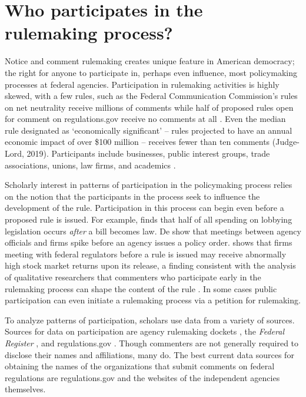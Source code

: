 \documentclass[12pt,notitlepage]{article}
\begin{document}
\hypertarget{who-participates-in-the-rulemaking-process}{%
\section{Who participates in the rulemaking
process?}\label{who-participates-in-the-rulemaking-process}}

Notice and comment rulemaking creates unique feature in American
democracy; the right for anyone to participate in, perhaps even
influence, most policymaking processes at federal agencies.
Participation in rulemaking activities is highly skewed, with a few
rules, such as the Federal Communication Commission's rules on net
neutrality receive millions of comments while half of proposed rules
open for comment on regulations.gov receive no comments at all
\citep{Libgober_JOP}. Even the median rule designated as `economically
significant' -- rules projected to have an annual economic impact of
over \$100 million -- receives fewer than ten comments (Judge-Lord,
2019). Participants include businesses, public interest groups, trade
associations, unions, law firms, and academics
\citep{Cuellar_ALR_2005, Yackee_JOP_2006}.

Scholarly interest in patterns of participation in the policymaking
process relies on the notion that the participants in the process seek
to influence the development of the rule. Participation in this process
can begin even before a proposed rule is issued. For example,
\citet{You_JOP_2017} finds that half of all spending on lobbying
legislation occurs \emph{after} a bill becomes law. De
\citet{deFigureido_Kim_ICC_2004} show that meetings between agency
officials and firms spike before an agency issues a policy order.
\citet{Libgober_QJPS} shows that firms meeting with federal regulators
before a rule is issued may receive abnormally high stock market returns
upon its release, a finding consistent with the analysis of qualitative
researchers that commenters who participate early in the rulemaking
process can shape the content of the rule \citep{Naughton_JPAM_2009}. In
some cases public participation can even initiate a rulemaking process
via a petition for rulemaking.

To analyze patterns of participation, scholars use data from a variety
of sources. Sources for data on participation are agency rulemaking
dockets
\citep{Golden_JPART_1998, Yackee_JPART_2006, Young_BP_2017, Ban_BP_2019},
the \emph{Federal Register}
\citep[\citet{West_PAR_2004}]{Balla_APSR_1998}, and regulations.gov
\citep{Gordon_Rashin_JOP}. Though commenters are not generally required
to disclose their names and affiliations, many do. The best current data
sources for obtaining the names of the organizations that submit
comments on federal regulations are regulations.gov and the websites of
the independent agencies themselves.
\end{document}
